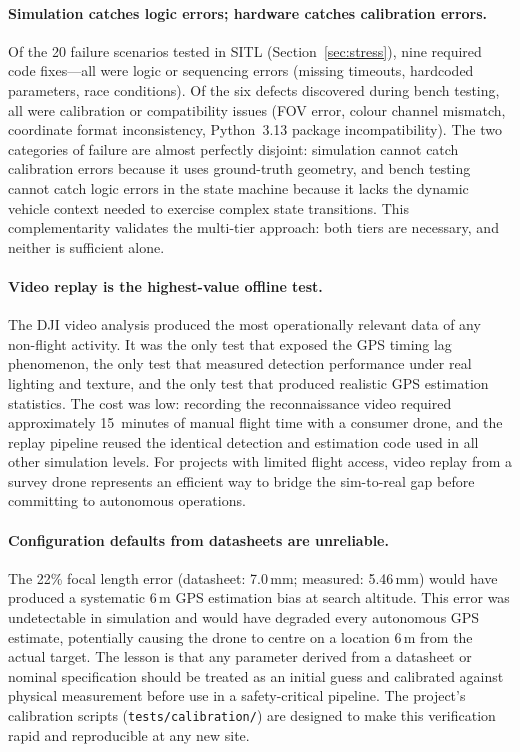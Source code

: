 \paragraph{Simulation catches logic errors; hardware catches calibration errors.}
Of the 20 failure scenarios tested in SITL (Section~\ref{sec:stress}), nine required code fixes---all were logic or sequencing errors (missing timeouts, hardcoded parameters, race conditions).  Of the six defects discovered during bench testing, all were calibration or compatibility issues (FOV error, colour channel mismatch, coordinate format inconsistency, Python~3.13 package incompatibility).  The two categories of failure are almost perfectly disjoint: simulation cannot catch calibration errors because it uses ground-truth geometry, and bench testing cannot catch logic errors in the state machine because it lacks the dynamic vehicle context needed to exercise complex state transitions.  This complementarity validates the multi-tier approach: both tiers are necessary, and neither is sufficient alone.

\paragraph{Video replay is the highest-value offline test.}
The DJI video analysis produced the most operationally relevant data of any non-flight activity.  It was the only test that exposed the GPS timing lag phenomenon, the only test that measured detection performance under real lighting and texture, and the only test that produced realistic GPS estimation statistics.  The cost was low: recording the reconnaissance video required approximately 15~minutes of manual flight time with a consumer drone, and the replay pipeline reused the identical detection and estimation code used in all other simulation levels.  For projects with limited flight access, video replay from a survey drone represents an efficient way to bridge the sim-to-real gap before committing to autonomous operations.

\paragraph{Configuration defaults from datasheets are unreliable.}
The 22\% focal length error (datasheet: 7.0\,mm; measured: 5.46\,mm) would have produced a systematic 6\,m GPS estimation bias at search altitude.  This error was undetectable in simulation and would have degraded every autonomous GPS estimate, potentially causing the drone to centre on a location 6\,m from the actual target.  The lesson is that any parameter derived from a datasheet or nominal specification should be treated as an initial guess and calibrated against physical measurement before use in a safety-critical pipeline.  The project's calibration scripts (\texttt{tests/calibration/}) are designed to make this verification rapid and reproducible at any new site.


